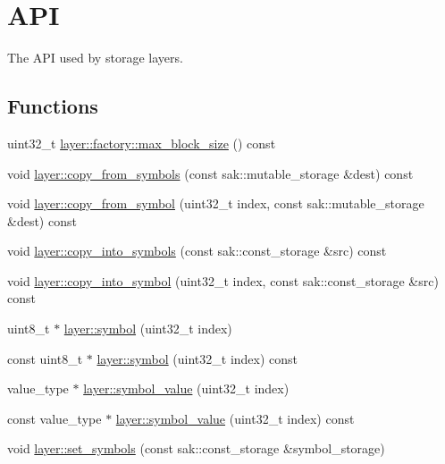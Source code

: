 \hypertarget{group__storage__api}{\section{A\-P\-I}
\label{group__storage__api}
}


The A\-P\-I used by storage layers.  


\subsection*{Functions}
\begin{DoxyCompactItemize}
\item 
uint32\-\_\-t \hyperlink{group__storage__api_gab2971f553662b40204cf4cc3810cc28f}{layer\-::factory\-::max\-\_\-block\-\_\-size} () const 
\item 
void \hyperlink{group__storage__api_ga7b7161e58ad9cc64c1cf010ef517f847}{layer\-::copy\-\_\-from\-\_\-symbols} (const sak\-::mutable\-\_\-storage \&dest) const 
\item 
void \hyperlink{group__storage__api_ga6121237db4e314475b0f358c21b6dbb5}{layer\-::copy\-\_\-from\-\_\-symbol} (uint32\-\_\-t index, const sak\-::mutable\-\_\-storage \&dest) const 
\item 
void \hyperlink{group__storage__api_gad72ab5996a9a27ea93a57b16da66a21d}{layer\-::copy\-\_\-into\-\_\-symbols} (const sak\-::const\-\_\-storage \&src) const 
\item 
void \hyperlink{group__storage__api_gabef8acaba64c240184b1c59ba1cdfab8}{layer\-::copy\-\_\-into\-\_\-symbol} (uint32\-\_\-t index, const sak\-::const\-\_\-storage \&src) const 
\item 
uint8\-\_\-t $\ast$ \hyperlink{group__storage__api_ga576eb5065641dfac94253dbd74b50c99}{layer\-::symbol} (uint32\-\_\-t index)
\item 
const uint8\-\_\-t $\ast$ \hyperlink{group__storage__api_ga6982431f8ad42387ac7310f673ccfd5b}{layer\-::symbol} (uint32\-\_\-t index) const 
\item 
value\-\_\-type $\ast$ \hyperlink{group__storage__api_ga63f5e57701b5499b0d102e25ae691ad9}{layer\-::symbol\-\_\-value} (uint32\-\_\-t index)
\item 
const value\-\_\-type $\ast$ \hyperlink{group__storage__api_gac7181479f7a80833b57937318d937699}{layer\-::symbol\-\_\-value} (uint32\-\_\-t index) const 
\item 
void \hyperlink{group__storage__api_gac90a4ce8eb50126267d92059c9e3b1a5}{layer\-::set\-\_\-symbols} (const sak\-::const\-\_\-storage \&symbol\-\_\-storage)

\end{DoxyCompactItemize}

